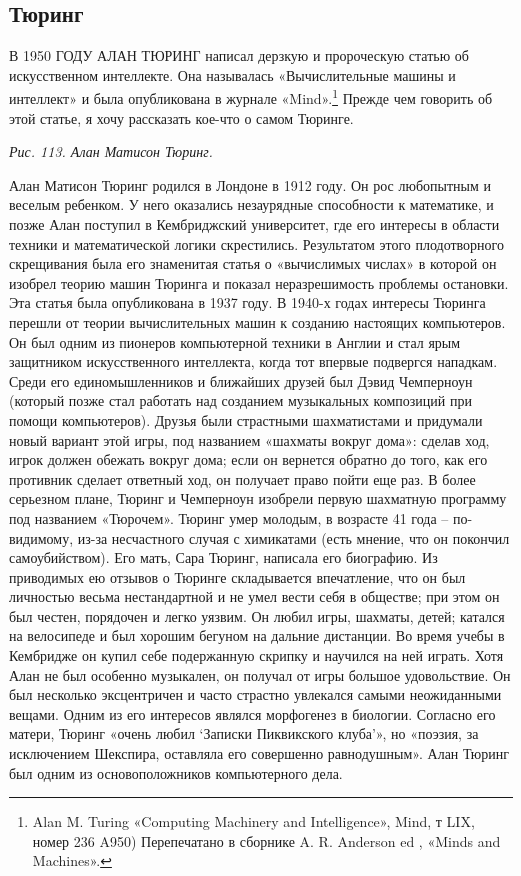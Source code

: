 \documentclass[../main.tex]{subfiles}
\begin{document}

\subsection{Тюринг}

В 1950 ГОДУ АЛАН ТЮРИНГ написал дерзкую и пророческую статью об искусственном интеллекте. Она называлась «Вычислительные машины и интеллект» и была опубликована в журнале «Mind».\footnote{Alan M. Turing «Computing Machinery and Intelligence», Mind, т LIX, номер 236 A950) Перепечатано в сборнике A. R. Anderson ed , «Minds and Machines».} Прежде чем говорить об этой статье, я хочу рассказать кое-что о самом Тюринге.

\emph{Рис. 113. Алан Матисон Тюринг.}

Алан Матисон Тюринг родился в Лондоне в 1912 году. Он рос любопытным и веселым ребенком. У него оказались незаурядные способности к математике, и позже Алан поступил в Кембриджский университет, где его интересы в области техники и математической логики скрестились. Результатом этого плодотворного скрещивания была его знаменитая статья о «вычислимых числах» в которой он изобрел теорию машин Тюринга и показал неразрешимость проблемы остановки. Эта статья была опубликована в 1937 году. В 1940-х годах интересы Тюринга перешли от теории вычислительных машин к созданию настоящих компьютеров. Он был одним из пионеров компьютерной техники в Англии и стал ярым защитником искусственного интеллекта, когда тот впервые подвергся нападкам. Среди его единомышленников и ближайших друзей был Дэвид Чемперноун (который позже стал работать над созданием музыкальных композиций при помощи компьютеров). Друзья были страстными шахматистами и придумали новый вариант этой игры, под названием «шахматы вокруг дома»: сделав ход, игрок должен обежать вокруг дома; если он вернется обратно до того, как его противник сделает ответный ход, он получает право пойти еще раз. В более серьезном плане, Тюринг и Чемперноун изобрели первую шахматную программу под названием «Тюрочем». Тюринг умер молодым, в возрасте 41 года \--- по-видимому, из-за несчастного случая с химикатами (есть мнение, что он покончил самоубийством). Его мать, Сара Тюринг, написала его биографию. Из приводимых ею отзывов о Тюринге складывается впечатление, что он был личностью весьма нестандартной и не умел вести себя в обществе; при этом он был честен, порядочен и легко уязвим. Он любил игры, шахматы, детей; катался на велосипеде и был хорошим бегуном на дальние дистанции. Во время учебы в Кембридже он купил себе подержанную скрипку и научился на ней играть. Хотя Алан не был особенно музыкален, он получал от игры большое удовольствие. Он был несколько эксцентричен и часто страстно увлекался самыми неожиданными вещами. Одним из его интересов являлся морфогенез в биологии. Согласно его матери, Тюринг «очень любил \enquote*{Записки Пиквикского клуба}», но «поэзия, за исключением Шекспира, оставляла его совершенно равнодушным». Алан Тюринг был одним из основоположников компьютерного дела.
\end{document}
